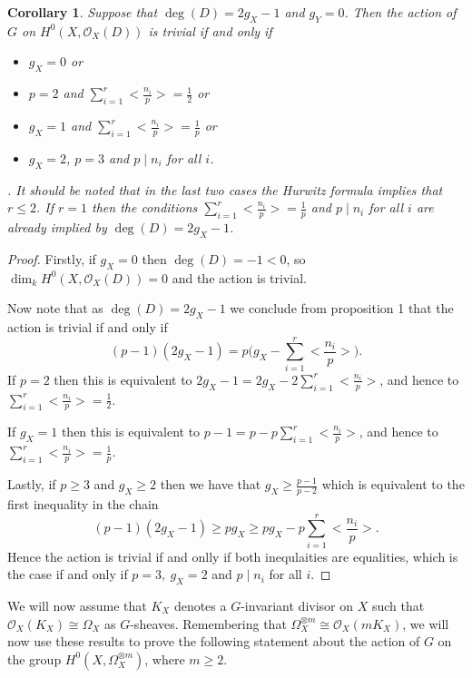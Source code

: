 \documentclass[11pt]{article} %
\newtheorem{cor}{Corollary}
\begin{document}
\begin{cor}
Suppose that $\deg(D)= 2g_X-1$ and $g_Y=0$. Then the action of $G$ on $H^0(X,\mathscr{O}_X(D))$ is trivial if and only if
	\begin{itemize}
		\item
			$g_X=0$ or
		\item
			$p=2$ and $\sum_{i=1}^r\Big<\frac{n_i}{p}\Big>=\frac{1}{2}$ or
		\item
			$g_X=1$ and $\sum_{i=1}^r\Big<\frac{n_i}{p}\Big>=\frac{1}{p}$ or
		\item
			$g_X=2$, $p=3$ and $p\mid n_i$ for all $i$.
	\end{itemize}.
It should be noted that in the last two cases the Hurwitz formula implies that $r\leq 2$. If $r=1$ then the conditions $\sum_{i=1}^r\Big<\frac{n_i}{p}\Big>=\frac{1}{p}$ and $p\mid n_i$ for all $i$ are already implied by $\deg(D)=2g_X-1$.
\end{cor}
\begin{proof}
Firstly, if $g_X=0$ then $\deg(D)=-1<0$, so $\dim_kH^0(X,\mathscr{O}_X(D))=0$ and the action is trivial.

Now note that as $\deg(D)=2g_X-1$ we conclude from proposition 1 that the action is trivial if and only if 
	\begin{equation*}
		(p-1)(2g_X-1)=p\Big(g_X-\sum_{i=1}^r\Big<\frac{n_i}{p}\Big>\Big).
	\end{equation*}
If $p=2$ then this is equivalent to $2g_X-1=2g_X-2\sum_{i=1}^r\Big<\frac{n_i}{p}\Big>$, and hence to $\sum_{i=1}^r\Big<\frac{n_i}{p}\Big>=\frac{1}{2}$.

If $g_X=1$ then this is equivalent to $p-1=p-p\sum_{i=1}^r\Big<\frac{n_i}{p}\Big>$, and hence to $\sum_{i=1}^r\Big<\frac{n_i}{p}\Big>=\frac{1}{p}$.

Lastly, if $p\geq 3$ and $g_X\geq 2$ then we have that $g_X\geq \frac{p-1}{p-2}$ which is equivalent to the first inequality in the chain
\begin{equation*}
	(p-1)(2g_X-1)\geq pg_X\geq pg_X-p\sum_{i=1}^r\Big<\frac{n_i}{p}\Big>.
\end{equation*}
Hence the action is trivial if and onlly if both inequlaities are equalities, which is the case if and only if $p=3,\ g_X=2$ and $p\mid n_i$ for all $i$.
\end{proof}
We will now assume that $K_X$ denotes a $G$-invariant divisor on $X$ such that $\mathscr{O}_X(K_X)\cong \Omega_X$ as $G$-sheaves. Remembering that $\Omega_X^{\otimes m}\cong \mathscr{O}_X(mK_X)$, we will now use these results to prove the following statement about the action of $G$ on the group $H^0(X,\Omega_X^{\otimes m})$, where $m\geq 2$. \\
\end{document}
